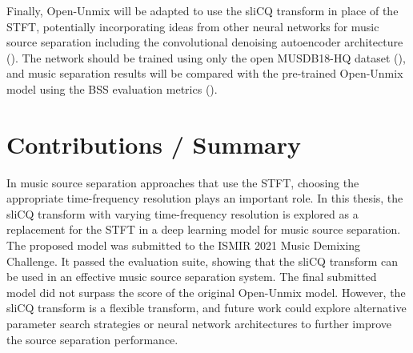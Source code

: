 \documentclass[letter,12pt]{article}
\begin{document}
Finally, Open-Unmix will be adapted to use the sliCQ transform in place of the STFT, potentially incorporating ideas from other neural networks for music source separation including the convolutional denoising autoencoder architecture (\cite{plumbley1, plumbley2}). The network should be trained using only the open MUSDB18-HQ dataset (\cite{musdb18hq}), and music separation results will be compared with the pre-trained Open-Unmix model using the BSS evaluation metrics (\cite{bss, sisec2018}).

\section{Contributions / Summary}

In music source separation approaches that use the STFT, choosing the appropriate time-frequency resolution plays an important role. In this thesis, the sliCQ transform with varying time-frequency resolution is explored as a replacement for the STFT in a deep learning model for music source separation. The proposed model was submitted to the ISMIR 2021 Music Demixing Challenge. It passed the evaluation suite, showing that the sliCQ transform can be used in an effective music source separation system. The final submitted model did not surpass the score of the original Open-Unmix model. However, the sliCQ transform is a flexible transform, and future work could explore alternative parameter search strategies or neural network architectures to further improve the source separation performance.

\vfill
\clearpage %

\printbibheading[title={References},heading=bibnumbered]
\printbibliography[heading=none]

\vfill
\clearpage %
\end{document}
